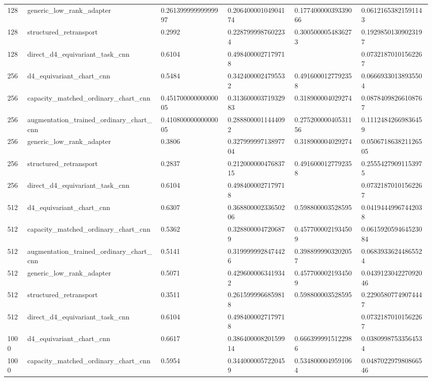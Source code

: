 \begin{table}[t]
\begin{tabular}{llllll}
128 & generic\_low\_rank\_adapter & 0.26139999999999997 & 0.20640000104904174 & 0.17740000039339066 & 0.06121653821591143 \\
128 & structured\_retransport & 0.2992 & 0.2287999987602234 & 0.3005000054836273 & 0.19298501309023197 \\
128 & direct\_d4\_equivariant\_task\_cnn & 0.6104 & 0.4984000027179718 &  & 0.07321870101562267 \\
256 & d4\_equivariant\_chart\_cnn & 0.5484 & 0.3424000024795532 & 0.4916000127792358 & 0.06669330138935504 \\
256 & capacity\_matched\_ordinary\_chart\_cnn & 0.45170000000000005 & 0.31360000371932983 & 0.318900004029274 & 0.08784098266108767 \\
256 & augmentation\_trained\_ordinary\_chart\_cnn & 0.41080000000000005 & 0.2888000011444092 & 0.27520000040531156 & 0.11124842669836459 \\
256 & generic\_low\_rank\_adapter & 0.3806 & 0.32799999713897704 & 0.318900004029274 & 0.050671863821126505 \\
256 & structured\_retransport & 0.2837 & 0.21200000047683715 & 0.4916000127792358 & 0.25554279091153975 \\
256 & direct\_d4\_equivariant\_task\_cnn & 0.6104 & 0.4984000027179718 &  & 0.07321870101562267 \\
512 & d4\_equivariant\_chart\_cnn & 0.6307 & 0.36880000233650206 & 0.598800003528595 & 0.04194449967442038 \\
512 & capacity\_matched\_ordinary\_chart\_cnn & 0.5362 & 0.3288000047206879 & 0.4577000021934509 & 0.061592059464523084 \\
512 & augmentation\_trained\_ordinary\_chart\_cnn & 0.5141 & 0.3199999928474426 & 0.3988999903202057 & 0.06839336244865524 \\
512 & generic\_low\_rank\_adapter & 0.5071 & 0.4296000063419342 & 0.4577000021934509 & 0.043912304227092046 \\
512 & structured\_retransport & 0.3511 & 0.2615999966859818 & 0.598800003528595 & 0.22905807749074447 \\
512 & direct\_d4\_equivariant\_task\_cnn & 0.6104 & 0.4984000027179718 &  & 0.07321870101562267 \\
1000 & d4\_equivariant\_chart\_cnn & 0.6617 & 0.38640000820159914 & 0.6663999915122986 & 0.03809987533564534 \\
1000 & capacity\_matched\_ordinary\_chart\_cnn & 0.5954 & 0.3440000057220459 & 0.5348000049591064 & 0.048702297980866546 \\

\end{tabular}
\end{table}
